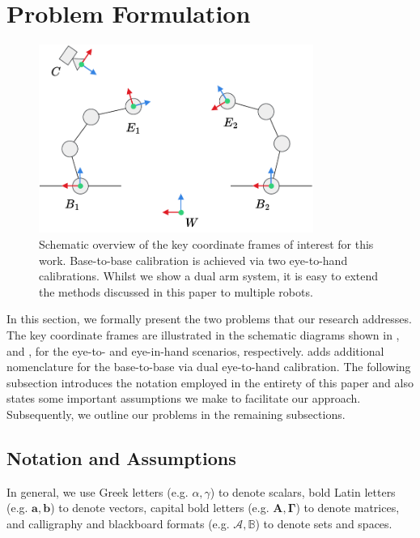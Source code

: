 \section{Problem Formulation}
\begin{figure}[tb]
    \centering
    \includegraphics[width=0.8\textwidth]{chapter_1/fig/eye_in_to_hand.pdf}
    \caption{
    Schematic overview of the key coordinate frames of interest for this work. Base-to-base calibration is achieved via two eye-to-hand calibrations. Whilst we show a dual arm system, it is easy to extend the methods discussed in this paper to multiple robots.
    }
    \label{c1:fig:base2base}
\end{figure}
In this section, we formally present the two problems that our research addresses. The key coordinate frames are illustrated in the schematic diagrams shown in , and , for the eye-to- and eye-in-hand scenarios, respectively.  adds additional nomenclature for the base-to-base via dual eye-to-hand calibration. The following subsection introduces the notation employed in the entirety of this paper and also states some important assumptions we make to facilitate our approach. 
Subsequently, we outline our problems in the remaining subsections.

\subsection{Notation and Assumptions}
In general, we use 
Greek letters (e.g. $\alpha, \gamma$) to denote scalars, bold 
Latin letters (e.g. $\mathbf{a}, \mathbf{b}$) to denote vectors, 
capital bold letters (e.g. $\mathbf{A}, \mathbf{\Gamma}$) to denote matrices, and 
calligraphy and blackboard formats (e.g. $\mathcal{A}, \mathbb{B}$) to denote sets and spaces.

